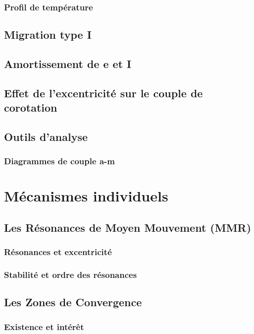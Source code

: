 \documentclass[a4paper,twoside]{book}
\begin{document}
\subsection{Profil de température}
\section{Migration type I}
\section{Amortissement de e et I}
\section{Effet de l'excentricité sur le couple de corotation}

\section{Outils d'analyse}
\subsection{Diagrammes de couple a-m}

\chapter{Mécanismes individuels}
\section{Les Résonances de Moyen Mouvement (MMR)}
\subsection{Résonances et excentricité}
\subsection{Stabilité et ordre des résonances}

\section{Les Zones de Convergence}
\subsection{Existence et intérêt}
\end{document}
